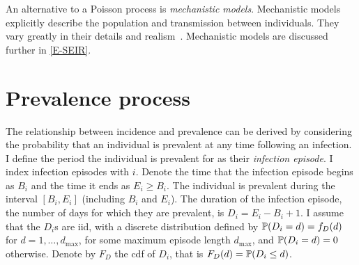 \documentclass[thesis.tex]{subfiles}
\begin{document}
An alternative to a Poisson process is \emph{mechanistic models}.
Mechanistic models explicitly describe the population and transmission between individuals.
They vary greatly in their details and realism~\autocite{murilloMultiscale}.
Mechanistic models are discussed further in \cref{E-SEIR}.






\section{Prevalence process}

The relationship between incidence and prevalence can be derived by considering the probability that an individual is prevalent at any time following an infection.
I define the period the individual is prevalent for as their \emph{infection episode}.
I index infection episodes with $i$.
Denote the time that the infection episode begins as $B_i$ and the time it ends as $E_i \geq B_i$.
The individual is prevalent during the interval $[B_i, E_i]$ (\ie including $B_i$ and $E_i$).
The duration of the infection episode, the number of days for which they are prevalent, is $D_i = E_i - B_i + 1$.
I assume that the $D_i$s are iid, with a discrete distribution defined by $\operatorname{\mathbb{P}}(D_i = d) = f_D(d)$ for $d = 1, \dots, d_\text{max}$, for some maximum episode length $d_\text{max}$, and $\operatorname{\mathbb{P}}(D_i = d) = 0$ otherwise.
Denote by $F_D$ the cdf of $D_i$, that is $F_D(d) = \operatorname{\mathbb{P}}(D_i \leq d)$.
\end{document}
